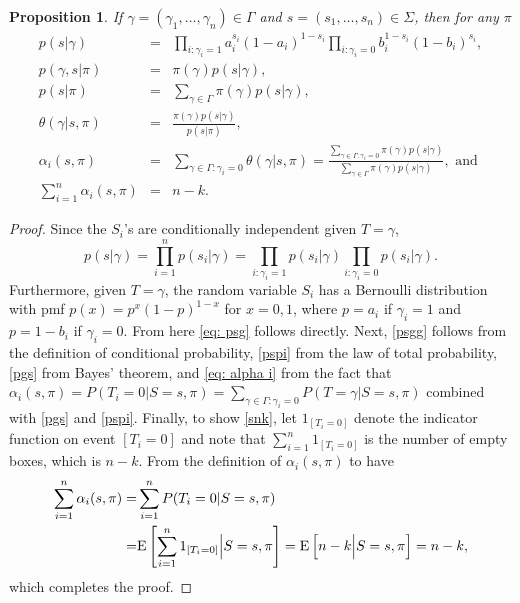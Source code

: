 \documentclass[a4paper,11pt]{article}
\newtheorem{prop}{Proposition}
\begin{document}
\begin{prop}\label{Prop1} If $\gamma=(\gamma_1,\dots,\gamma_n) \in \Gamma$ and $s=(s_1,\dots,s_n)\in\Sigma$, then for any $\pi$
\begin{eqnarray}
p(s|\gamma)&=&\prod_{i: \gamma_i=1}a_i^{s_i}(1-a_i)^{1-s_i}\prod_{i: \gamma_i=0}b_i^{1-s_i}(1-b_i)^{s_i}, \label{eq: psg}\\
p(\gamma,s|\pi)&=&\pi(\gamma)p(s|\gamma),       \label{psgg}\\
p(s|\pi)&=&\sum_{\gamma\in \Gamma}\pi(\gamma)p(s|\gamma),       \label{pspi}\\
\theta(\gamma|s,\pi) &=&\frac{\pi(\gamma)p(s|\gamma)}{p(s|\pi)} , \label{pgs}\\
\alpha_i(s,\pi)&=& \sum_{\gamma\in\Gamma: \gamma_i=0}\theta(\gamma |s,\pi)=
\frac{\sum\limits_{\gamma\in\Gamma: \gamma_i=0} \pi(\gamma)p(s|\gamma)}{\sum_{\gamma\in \Gamma}\pi(\gamma)p(s|\gamma)}, \mbox{ and }\label{eq: alpha i}\\
\sum_{i=1}^n\alpha_i(s,\pi) &=& n-k. \label{snk}
\end{eqnarray}
\end{prop}

\begin{proof}
Since the $S_i$'s are conditionally independent given $T=\gamma$,
$$
p(s|\gamma)=\prod_{i=1}^{n}p(s_i|\gamma)=\prod_{i: \gamma_i=1}p(s_i|\gamma)\prod_{i: \gamma_i=0}p(s_i|\gamma).
$$
Furthermore, given $T=\gamma$, the random variable $S_i$ has a Bernoulli distribution with pmf $p(x)=p^x(1-p)^{1-x}$ for $x=0,1$, where $p=a_i$ if $\gamma_i=1$ and $p=1-b_i$ if $\gamma_i=0$. From here \eqref{eq: psg} follows directly. Next, \eqref{psgg} follows from the definition of conditional probability, \eqref{pspi} from the law of total probability, \eqref{pgs} from Bayes' theorem, and \eqref{eq: alpha i} from the fact that $\alpha_i(s,\pi)= P(T_i=0 |S=s,\pi)=\sum_{\gamma\in\Gamma: \gamma_i=0}P(T=\gamma|S=s,\pi)$ combined with \eqref{pgs} and \eqref{pspi}. Finally, to show \eqref{snk}, let $1_{[T_i=0]}$ denote the indicator function on event $[T_i=0]$ and note that $\sum_{i=1}^n 1_{[T_i=0]}$ is the number of empty boxes, which is $n-k$. From the definition of $\alpha_i(s,\pi)$ to have
\[
\begin{aligned}
\sum_{i=1}^n\alpha_i(s,\pi)=&
\sum_{i=1}^n P(T_i=0 |S=s,\pi)\\
=&\mathrm E\left[\sum_{i=1}^n 1_{[T_i=0]}\Big{|}S= s,\pi\right] = \mathrm E\left[ n-k\Big{|} S=s,\pi\right] = n-k,
\end{aligned}
\]
which completes the proof.
\end{proof}
\end{document}
